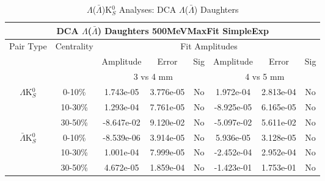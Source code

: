 \documentclass[../AnalysisNoteJBuxton.tex]{subfiles}
\begin{document}
\begin{table}
 \centering
 \begin{tabular}{|c|c|c|c|c||c|c|c|}
  \multicolumn{8}{c}{DCA $\Lambda$($\bar{\Lambda}$) Daughters 500MeVMaxFit SimpleExp} \\
  \hline
  \multirow{3}{*}{Pair Type} & \multirow{3}{*}{Centrality} & \multicolumn{6}{c|}{Fit Amplitudes} \\
  \cline{3-8}
   & & Amplitude & Error & Sig & Amplitude & Error & Sig \\  
  \cline{3-8}
   & & \multicolumn{3}{c||}{3 vs 4 mm} & \multicolumn{3}{c|}{4 vs 5 mm} \\  
  \hline  
  \multirow{3}{*}{$\Lambda$K$^{0}_{S}$}  
   &  0-10\% & 1.743e-05 & 3.776e-05 & No & 1.972e-04 & 2.813e-04 & No \\
   & 10-30\% & 1.293e-04 & 7.761e-05 & No & -8.925e-05 & 6.165e-05 & No \\
   & 30-50\% & -8.647e-02 & 9.120e-02 & No & -5.097e-02 & 5.611e-02 & No \\
  \hline  
  \multirow{3}{*}{$\bar{\Lambda}$K$^{0}_{S}$}  
   &  0-10\% & -8.539e-06 & 3.914e-05 & No & 5.936e-05 & 3.128e-05 & No \\
   & 10-30\% & 1.001e-04 & 7.999e-05 & No & -2.452e-04 & 2.952e-04 & No \\
   & 30-50\% & 4.672e-05 & 1.859e-04 & No & -1.423e-01 & 1.753e-01 & No \\
  \hline
 \end{tabular}
 \caption{$\Lambda$($\bar{\Lambda}$)K$^{0}_{S}$ Analyses: DCA $\Lambda$($\bar{\Lambda}$) Daughters}
 \label{tab:LamDaughtersDcaLamK0_500MeVMaxFit_SimpleExp}
\end{table}





\end{document}
